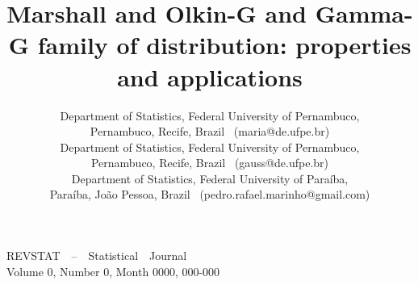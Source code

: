 \documentclass[twoside,leqno,11pt]{article}
\begin{document}
\thispagestyle{firstpage}

\vspace{-3.2cm}

\noindent
{\footnotesize {\sffamily REVSTAT~~--~~Statistical~~Journal\\[-1pt]
		Volume 0, Number 0, Month 0000,
		000-000}}

\vspace{1.5cm}
\title{Marshall and Olkin-G and Gamma-G family of distribution: properties and applications
}
\renewcommand{\titleheading}
{MOGG family of distribution: properties and applications}  %

\author{ 
	{Department of Statistics,
		Federal University of Pernambuco,\\
        Pernambuco, Recife, Brazil
		\ (maria@de.ufpe.br)}
	\\
	{Department of Statistics,
		Federal University of Pernambuco,\\
		Pernambuco, Recife, Brazil
		\ (gauss@de.ufpe.br)}
	\\
	{Department of Statistics,
		Federal University of Paraíba,\\
		Paraíba, João Pessoa, Brazil
		\ (pedro.rafael.marinho@gmail.com)}
}
\renewcommand{\authorheading}
{Maria do Carmo S. Lima, Gauss M. Cordeiro and Pedro Rafael D. Marinho, }  %
\end{document}
